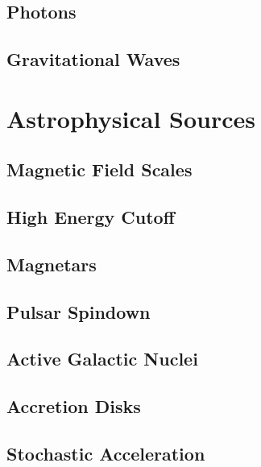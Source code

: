 \subsection{Photons}
\label{sub:photons}



\subsection{Gravitational Waves}
\label{sub:gravitational}



\section{Astrophysical Sources}
\label{sec:sources}



\subsection{Magnetic Field Scales}
\label{sub:fields}



\subsection{High Energy Cutoff}
\label{sub:cutoff}



\subsection{Magnetars}
\label{sub:magnetars}



\subsection{Pulsar Spindown}
\label{sub:spindown}



\subsection{Active Galactic Nuclei}
\label{sub:nuclei}



\subsection{Accretion Disks}
\label{sub:accretion}



\subsection{Stochastic Acceleration}
\label{sub:acceleration}
